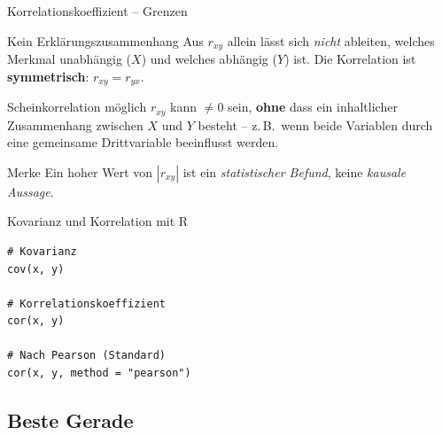 \documentclass[aspectratio=169,11pt]{beamer}
\begin{document}
\begin{frame}{Korrelationskoeffizient -- Grenzen}
  \begin{alertblock}{Kein Erklärungszusammenhang}
    Aus $r_{xy}$ allein lässt sich \emph{nicht} ableiten, welches
    Merkmal unabhängig ($X$) und welches abhängig ($Y$) ist.
    Die Korrelation ist \textbf{symmetrisch}: $r_{xy} = r_{yx}$.
  \end{alertblock}

  \medskip

  \begin{alertblock}{Scheinkorrelation möglich}
    $r_{xy}$ kann $\ne 0$ sein, \textbf{ohne} dass ein inhaltlicher
    Zusammenhang zwischen $X$ und $Y$ besteht -- z.\,B.\ wenn beide
    Variablen durch eine gemeinsame Drittvariable beeinflusst werden.
  \end{alertblock}

  \medskip

  \begin{block}{Merke}
    Ein hoher Wert von $|r_{xy}|$ ist ein \emph{statistischer Befund},
    keine \emph{kausale Aussage}. 
  \end{block}
\end{frame}



\begin{frame}[fragile]{Kovarianz und Korrelation mit R}
\begin{lstlisting}
# Kovarianz
cov(x, y)

# Korrelationskoeffizient
cor(x, y)

# Nach Pearson (Standard)
cor(x, y, method = "pearson")
\end{lstlisting}
\end{frame}






\subsection{Beste Gerade}
\end{document}
